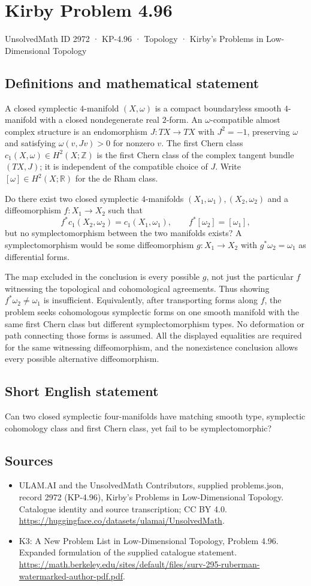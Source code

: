 \documentclass[11pt,a4paper]{article}
\begin{document}
\section*{Kirby Problem 4.96}\label{2972}
{\small UnsolvedMath ID 2972 · KP-4.96 · Topology · Kirby's Problems in Low-Dimensional Topology}
\subsection{Definitions and mathematical statement}
A closed symplectic $4$-manifold $(X,\omega)$ is a compact
boundaryless smooth $4$-manifold with a closed nondegenerate real
$2$-form. An $\omega$-compatible almost complex structure is an
endomorphism $J:TX\to TX$ with $J^2=-1$, preserving $\omega$
and satisfying $\omega(v,Jv)>0$ for nonzero $v$.
The first Chern class $c_1(X,\omega)\in H^2(X;\mathbb Z)$
is the first Chern class of the complex tangent bundle $(TX,J)$;
it is independent of the compatible choice of $J$.
Write $[\omega]\in H^2(X;\mathbb R)$ for the de Rham class.

Do there exist two closed symplectic $4$-manifolds
$(X_1,\omega_1),(X_2,\omega_2)$ and a diffeomorphism
$f:X_1\to X_2$ such that
\[
 f^*c_1(X_2,\omega_2)=c_1(X_1,\omega_1),\qquad
 f^*[\omega_2]=[\omega_1],
\]
but no symplectomorphism between the two manifolds exists?
A symplectomorphism would be some diffeomorphism $g:X_1\to X_2$
with $g^*\omega_2=\omega_1$ as differential forms.

The map excluded in the conclusion is every possible $g$, not
just the particular $f$ witnessing the topological and cohomological
agreements. Thus showing $f^*\omega_2\ne\omega_1$ is insufficient.
Equivalently, after transporting forms along $f$, the problem seeks
cohomologous symplectic forms on one smooth manifold with the same
first Chern class but different symplectomorphism types. No deformation
or path connecting those forms is assumed.
All the displayed equalities are required for the same witnessing
diffeomorphism, and the nonexistence conclusion allows every
possible alternative diffeomorphism.
\subsection{Short English statement}
Can two closed symplectic four-manifolds have matching smooth type, symplectic cohomology class and first Chern class, yet fail to be symplectomorphic?
\subsection{Sources}
\begin{itemize}
\item[S1] ULAM.AI and the UnsolvedMath Contributors, supplied problems.json, record 2972 (KP-4.96), Kirby's Problems in Low-Dimensional Topology. Catalogue identity and source transcription; CC BY 4.0.
\url{https://huggingface.co/datasets/ulamai/UnsolvedMath}.
\item[S2] K3: A New Problem List in Low-Dimensional Topology, Problem 4.96. Expanded formulation of the supplied catalogue statement.
\url{https://math.berkeley.edu/sites/default/files/surv-295-ruberman-watermarked-author-pdf.pdf}.
\end{itemize}
\end{document}

